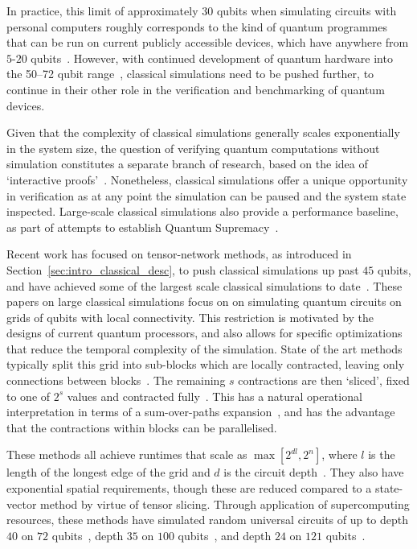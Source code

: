 In practice, this limit of approximately $30$ qubits when simulating circuits with personal computers roughly corresponds to the kind of quantum programmes that can be run on current publicly accessible devices, which have anywhere from $5$-$20$ qubits~\cite{IBMQ,RigettiQPU}. However, with continued development of quantum hardware into the 50--72 qubit range~\cite{IBM50,GoogleBristlecone}, classical simulations need to be pushed further, to continue in their other role in the verification and benchmarking of quantum devices.\par
Given that the complexity of classical simulations generally scales exponentially in the system size, the question of verifying quantum computations without simulation constitutes a separate branch of research, based on the idea of `interactive proofs'~\cite{Aharonov2017,Mahadev2018}. Nonetheless, classical simulations offer a unique opportunity in verification as at any point the simulation can be paused and the system state inspected. Large-scale classical simulations also provide a performance baseline, as part of attempts to establish Quantum Supremacy~\cite{Preskill2012,Aaronson2016}.\par
Recent work has focused on tensor-network methods, as introduced in Section~\ref{sec:intro_classical_desc}, to push classical simulations up past $45$ qubits, and have achieved some of the largest scale classical simulations to date~\cite{Pendault2017,Chen2018,Chen2018b,Markov2018,Villalonga2019}. These papers on large classical simulations focus on on simulating quantum circuits on grids of qubits with local connectivity. This restriction is motivated by the designs of current quantum processors, and also allows for specific optimizations that reduce the temporal complexity of the simulation. State of the art methods typically split this grid into sub-blocks which are locally contracted, leaving only connections between blocks~\cite{Pendault2017,Chen2018b,Markov2018,Villalonga2018}. The remaining $s$ contractions are then `sliced', fixed to one of $2^{s}$ values and contracted fully~\cite{Pendault2017}. This has a natural operational interpretation in terms of a sum-over-paths expansion~\cite{Markov2018}, and has the advantage that the contractions within blocks can be parallelised.\par
These methods all achieve runtimes that scale as $\max \left[ 2^{dl}, 2^{n}\right]$, where $l$ is the length of the longest edge of the grid and $d$ is the circuit depth~\cite{Markov2005}. They also have exponential spatial requirements, though these are reduced compared to a state-vector method by virtue of tensor slicing. Through application of supercomputing resources, these methods have simulated random universal circuits of up to depth $40$ on $72$ qubits~\cite{Villalonga2018}, depth $35$ on $100$ qubits~\cite{Chen2018}, and depth $24$ on $121$ qubits~\cite{Villalonga2019}.\par
